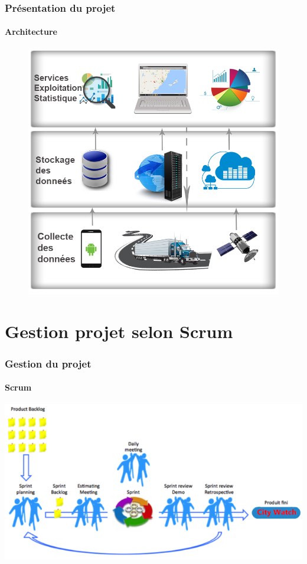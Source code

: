 \documentclass{beamer}
\begin{document}
\begin{frame}
    \frametitle{Présentation du projet}
    \framesubtitle{Architecture}
    \begin{figure}
        \centering
    \includegraphics[width=.73\textwidth]{figures/citywatch-modules.png}
\end{figure}
\end{frame}

\section{Gestion projet selon Scrum}
\begin{frame}
    \frametitle{Gestion du projet}
    \framesubtitle{Scrum}
    \includegraphics{figures/scrum-model.png}
\end{frame}
\end{document}
